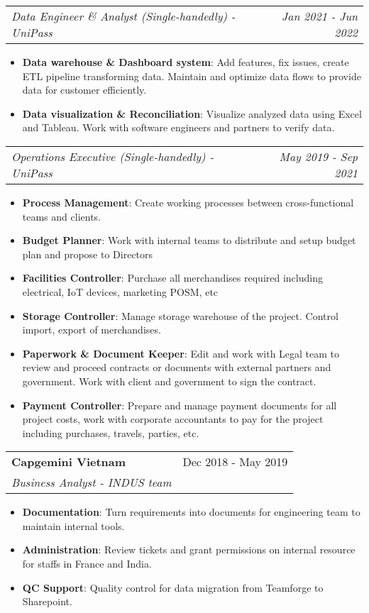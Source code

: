 \documentclass[letterpaper,11pt]{article}
\makeatletter
\newcommand{\resumeItem}[2]{
  \item\small{
    \textbf{#1}{: #2 \vspace{-2pt}}
  }
}
\newcommand{\resumeItemNornal}[1]{
  \item\small{
    {#1 \vspace{-2pt}}
  }
}
\newcommand{\resumeSubheading}[4]{
  \vspace{-1pt}
  \item
    \begin{tabular*}{0.97\textwidth}{l@{\extracolsep{\fill}}r}
      \textbf{#1} & #2 \\
      \textit{\small#3} & \textit{\small #4} \\
    \end{tabular*}\vspace{-5pt}
}
\newcommand{\resumeSubheadingNoTitle}[2]{
  \vspace{-1pt}
    \begin{tabular*}{0.97\textwidth}{l@{\extracolsep{\fill}}r}
      \textit{\small#1} & \textit{\small#2}
    \end{tabular*}\vspace{-5pt}
}
\newcommand{\resumeSubItemNormal}[1]{\resumeItemNornal{#1}\vspace{-4pt}}
\newcommand{\resumeItemListStart}{\begin{itemize}}
\newcommand{\resumeItemListEnd}{\end{itemize}\vspace{-5pt}}
\makeatother
\begin{document}
      \resumeSubheadingNoTitle
      {Data Engineer \& Analyst (Single-handedly) - UniPass}{Jan 2021 - Jun 2022}
      \resumeItemListStart
        \resumeItem{Data warehouse \& Dashboard system}
        {Add features, fix issues, create ETL pipeline transforming data. Maintain and optimize data flows to provide data for customer efficiently.}
        \resumeItem{Data visualization \& Reconciliation}
        {Visualize analyzed data using Excel and Tableau. Work with software engineers and partners to verify data.}
      \resumeItemListEnd
      \resumeSubheadingNoTitle
      {Operations Executive (Single-handedly) - UniPass}{May 2019 - Sep 2021}
      \resumeItemListStart
        \resumeItem{Process Management}{Create working processes between cross-functional teams and clients.}
        \resumeItem{Budget Planner}{Work with internal teams to distribute and setup budget plan and propose to Directors}
        \resumeItem{Facilities Controller}
        {Purchase all merchandises required including electrical, IoT devices, marketing POSM, etc}
        \resumeItem{Storage Controller}
        {Manage storage warehouse of the project. Control import, export of merchandises.}
        \resumeItem{Paperwork \& Document Keeper}
          {Edit and work with Legal team to review and proceed contracts or documents with external partners and government. Work with client and government to sign the contract.}
         \resumeItem{Payment Controller}
          {Prepare and manage payment documents for all project costs, work with corporate accountants to pay for the project including purchases, travels, parties, etc.}
      \resumeItemListEnd
      
    \resumeSubheading
      {Capgemini Vietnam}{Dec 2018 - May 2019}
      {Business Analyst - INDUS team}{}
      \resumeItemListStart
        \resumeItem{Documentation}
          {Turn requirements into documents for engineering team to maintain internal tools.} 
        \resumeItem{Administration}
            {Review tickets and grant permissions on internal resource for staffs in France and India.}
        \resumeItem{QC Support}    
            {Quality control for data migration from Teamforge to Sharepoint. }
      \resumeItemListEnd
\end{document}

